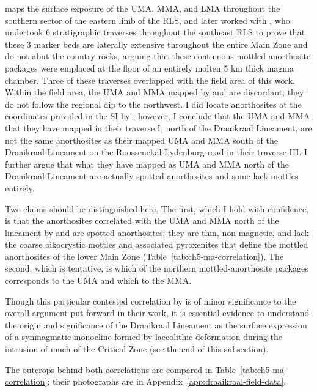 \citet{vandermerwe2007} maps the surface exposure of the UMA, MMA, and LMA
throughout the southern sector of the eastern limb of the RLS, and later
worked with \citet{latypovetal2022}, who undertook 6 stratigraphic
traverses throughout the southeast RLS to prove that these 3 marker beds
are laterally extensive throughout the entire Main Zone and do not abut
the country rocks, arguing that these continuous mottled anorthosite
packages were emplaced at the floor of an entirely molten 5 km thick
magma chamber. Three of these traverses overlapped with the field area
of this work. Within the field area, the UMA and MMA mapped by
\citet{vandermerwe2007} and \citet{latypovetal2022} are discordant; they do not
follow the regional dip to the northwest. I did locate anorthosites at
the coordinates provided in the SI by \citet{latypovetal2022}; however, I
conclude that the UMA and MMA that they have mapped in their traverse I,
north of the Draaikraal Lineament, are not the same anorthosites as
their mapped UMA and MMA south of the Draaikraal Lineament on the
Roossenekal-Lydenburg road in their traverse III. I further argue that
what they have mapped as UMA and MMA north of the Draaikraal Lineament
are actually spotted anorthosites and some lack mottles entirely.

Two claims should be distinguished here. The first, which I hold with
confidence, is that the anorthosites correlated with the UMA and MMA north
of the lineament by \citet{vandermerwe2007} and \citet{latypovetal2022} are
spotted anorthosites: they are thin, non-magnetic, and lack the coarse
oikocrystic mottles and associated pyroxenites that define the mottled
anorthosites of the lower Main Zone (Table~\ref{tab:ch5-ma-correlation}). The
second, which is tentative, is which of the northern mottled-anorthosite
packages corresponds to the UMA and which to the MMA.

Though this particular contested
correlation by \citet{latypovetal2022} is of minor significance to the
overall argument put forward in their work, it is essential evidence to
understand the origin and significance of the Draaikraal Lineament as
the surface expression of a synmagmatic monocline formed by laccolithic
deformation during the intrusion of much of the Critical Zone (see the end of this subsection).

The outcrops behind both correlations are compared in Table~\ref{tab:ch5-ma-correlation}; their photographs are in Appendix~\ref{app:draaikraal-field-data}.




